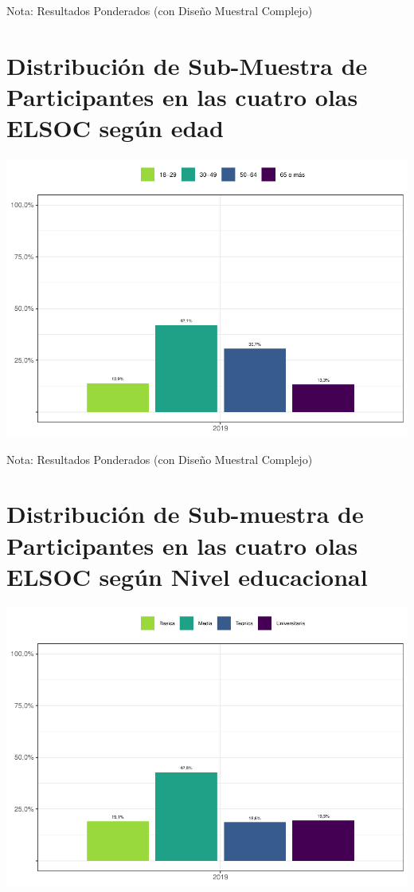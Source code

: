 \documentclass[
  12pt,
]{book}
\begin{document}
Nota: Resultados Ponderados (con Diseño Muestral Complejo)

\hypertarget{distribuciuxf3n-de-sub-muestra-de-participantes-en-las-cuatro-olas-elsoc-seguxfan-edad}{%
\section{Distribución de Sub-Muestra de Participantes en las cuatro olas ELSOC según edad}\label{distribuciuxf3n-de-sub-muestra-de-participantes-en-las-cuatro-olas-elsoc-seguxfan-edad}}

\begin{center}\includegraphics[width=0.75\linewidth]{concepto-medicion_files/figure-latex/unnamed-chunk-17-1} \end{center}

Nota: Resultados Ponderados (con Diseño Muestral Complejo)

\hypertarget{distribuciuxf3n-de-sub-muestra-de-participantes-en-las-cuatro-olas-elsoc-seguxfan-nivel-educacional}{%
\section{Distribución de Sub-muestra de Participantes en las cuatro olas ELSOC según Nivel educacional}\label{distribuciuxf3n-de-sub-muestra-de-participantes-en-las-cuatro-olas-elsoc-seguxfan-nivel-educacional}}

\begin{center}\includegraphics[width=0.75\linewidth]{concepto-medicion_files/figure-latex/unnamed-chunk-18-1} \end{center}
\end{document}
